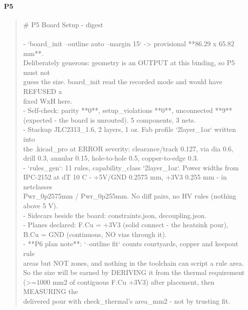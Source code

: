 \documentclass[11pt,a4paper]{article}
\begin{document}
\paragraph*{P5}
\begin{quote}\small\ttfamily\raggedright
\# P5 Board Setup - digest\\
~\\
- `board\_init --outline auto --margin 15` -\textgreater{} provisional {*}{*}86.29 x 65.82 mm{*}{*}.\\
  Deliberately generous: geometry is an OUTPUT at this binding, so P5 must not\\
  guess the size. board\_init read the recorded mode and would have REFUSED a\\
  fixed WxH here.\\
- Self-check: parity {*}{*}0{*}{*}, setup\_violations {*}{*}0{*}{*}, unconnected {*}{*}9{*}{*}\\
  (expected - the board is unrouted). 5 components, 3 nets.\\
- Stackup JLC2313\_1.6, 2 layers, 1 oz. Fab profile `2layer\_1oz` written into\\
  the .kicad\_pro at ERROR severity: clearance/track 0.127, via dia 0.6,\\
  drill 0.3, annular 0.15, hole-to-hole 0.5, copper-to-edge 0.3.\\
- `rules\_gen`: 11 rules, capability\_class `2layer\_1oz`. Power widths from\\
  IPC-2152 at dT 10 C - +5V/GND 0.2575 mm, +3V3 0.255 mm - in netclasses\\
  Pwr\_0p2575mm / Pwr\_0p255mm. No diff pairs, no HV rules (nothing above 5 V).\\
- Sidecars beside the board: constraints.json, decoupling.json.\\
- Planes declared: F.Cu = +3V3 (solid connect - the heatsink pour),\\
  B.Cu = GND (continuous, NO vias through it).\\
- {*}{*}P6 plan note{*}{*}: `--outline fit` counts courtyards, copper and keepout rule\\
  areas but NOT zones, and nothing in the toolchain can script a rule area.\\
  So the size will be earned by DERIVING it from the thermal requirement\\
  (\textgreater{}=1000 mm2 of contiguous F.Cu +3V3) after placement, then MEASURING the\\
  delivered pour with check\_thermal's area\_mm2 - not by trusting fit.
\end{quote}
\end{document}
